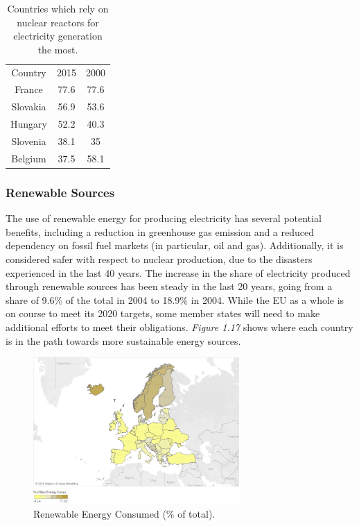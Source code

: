 \documentclass{book}
\begin{document}
\bigskip
\begin{table}[H]
\begin{center}
\begin{tabular}{|c|c|c|}
\hline
\rowcolor{lightgray} \multicolumn{3}{|c|}{Nuclear Energy (\% of total)}\\
\hline
Country & 2015 & 2000 \\
\hline
France & 77.6 & 77.6 \\
Slovakia & 56.9 & 53.6 \\
Hungary & 52.2 & 40.3 \\
Slovenia & 38.1 & 35 \\
Belgium & 37.5 & 58.1\\
\hline
\end{tabular}
\caption{Countries which rely on nuclear reactors for electricity generation the most.}
\end{center}
\end{table}
\bigskip

\subsubsection*{Renewable Sources}

The use of renewable energy for producing electricity has several potential benefits, including a reduction in greenhouse gas emission and a reduced dependency on fossil fuel markets (in particular, oil and gas). Additionally, it is considered safer with respect to nuclear production, due to the disasters experienced in the last 40 years. The increase in the share of electricity produced through renewable sources has been steady in the last 20 years, going from a share of 9.6\% of the total in 2004 to 18.9\% in 2004. While the EU as a whole is on course to meet its 2020 targets, some member states will need to make additional efforts to meet their obligations.
\textit{Figure 1.17} shows where each country is in the path towards more sustainable energy sources.

\bigskip
\begin{figure}[H]
\begin{center}
\captionsetup{justification=centering}
\includegraphics[width=0.7\textwidth]{Images/ren.png}
\caption{Renewable Energy Consumed (\% of total). }
\end{center}
\end{figure}
\bigskip
\end{document}
